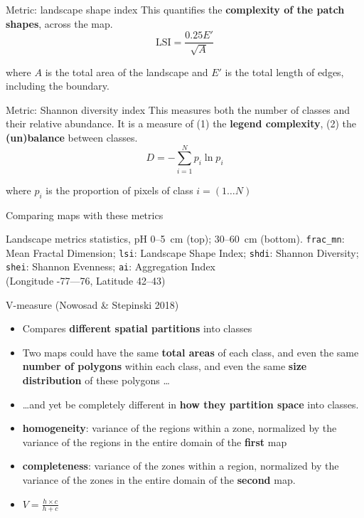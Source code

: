 \documentclass[aspectratio=169]{beamer}
\begin{document}
\begin{frame}{Metric: landscape shape index}
    This quantifies the \textbf{complexity of the patch shapes}, across the map.
    $$   \mathrm{LSI} = \frac{0.25 E'}{\sqrt{A}}$$

    where $A$ is the total area of the landscape and $E'$ is the total length of edges, including the boundary.
\end{frame}

\begin{frame}{Metric: Shannon diversity index}
    This measures both the number of classes and their relative abundance. It is a measure of (1) the \textbf{legend complexity}, (2) the \textbf{(un)balance} between classes.
    $$ D = - \sum_{i=1}^N p_i \ln p_i$$

    where $p_i$ is the proportion of pixels of class $i = (1 \ldots N)$
\end{frame}

\begin{frame}{Comparing maps with these metrics}
\par
    
    \par
    Landscape metrics statistics, pH 0--5~cm (top); 30--60~cm (bottom). \texttt{frac\_mn}: Mean Fractal Dimension; \texttt{lsi}: Landscape Shape Index; \texttt{shdi}: Shannon Diversity; \texttt{shei}: Shannon Evenness; \texttt{ai}: Aggregation Index\\
    (Longitude -77---76\textdegree, Latitude 42--43\textdegree)
\end{frame}

\begin{frame}{V-measure (Nowosad \& Stepinski 2018)}
\begin{itemize}
    \item Compares \textbf{different spatial partitions} into classes
\item Two maps could have the same \textbf{total areas} of each class, and even the same \textbf{number of polygons} within each class, and even the same \textbf{size distribution} of these polygons \ldots
\item \ldots and yet be completely different in \textbf{how they partition space} into classes.
\item \textbf{homogeneity}: variance of the regions within a zone, normalized by the variance of the regions in the entire domain of the \textbf{first} map
\item \textbf{completeness}: variance of the zones within a region, normalized by the variance of the zones in the entire domain of the \textbf{second} map.
\item $V = \frac{h \times c}{h + c}$
\end{itemize}
\end{frame}
\end{document}
